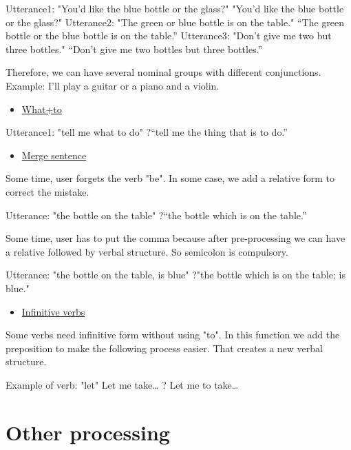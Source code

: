 \documentclass[twoside,a4paper,10pt]{report}
\newcommand{\dokutitleleveltree}[1]{\section{#1}}
\newcommand{\dokuunderline}[1]{\underline{#1}}
\newcommand{\dokuitem}{\item}
\begin{document}
\small
\begin{verbatimtab}
  Utterance1: "You'd like the blue bottle or the glass?"
  "You'd like the blue bottle or the glass?"
  Utterance2: "The green or blue bottle is on the table."
  “The green bottle or the blue bottle is on the table.”
  Utterance3: "Don’t give me two but three bottles."
  “Don’t give me two bottles but three bottles.”
\end{verbatimtab}
\normalsize
Therefore, we can have several nominal groups with different conjunctions. Example: I'll play a guitar or a piano and a violin.



\begin{itemize}
\dokuitem  \dokuunderline{What+to}
\end{itemize}
    Utterance1: "tell me what to do"
    ?“tell me the thing that is to do.”



\begin{itemize}
\dokuitem  \dokuunderline{Merge sentence}
\end{itemize}
Some time, user forgets the verb "be". In some case, we add a relative form to correct the mistake.


\small
\begin{verbatimtab}
  Utterance: "the bottle on the table" 
  ?“the bottle which is on the table.”
\end{verbatimtab}
\normalsize
Some time, user has to put the comma because after pre-processing we can have a relative followed by verbal structure. So semicolon is compulsory.


\small
\begin{verbatimtab}
  Utterance: "the bottle on the table, is blue" 
  ?"the bottle which is on the table; is blue."
\end{verbatimtab}
\normalsize

\begin{itemize}
\dokuitem  \dokuunderline{Infinitive verbs}
\end{itemize}
Some verbs need infinitive form without using "to". In this function we add the preposition to make the following process easier. That creates a new verbal structure.


\small
\begin{verbatimtab}
 Example of verb: "let"
 Let me take… ? Let me to take… 
\end{verbatimtab}
\normalsize

\dokutitleleveltree{Other processing}
\label{b5a7a96e3b75d0ff95064af9e93e7927}%
\end{document}

